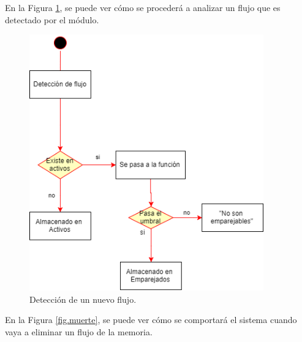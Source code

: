\intro En la Figura \ref{fig.nacimiento}, se puede ver cómo se procederá a analizar un flujo que es detectado por el módulo.

\begin{figure}[H]
  \includegraphics[width=0.9\textwidth]{imagenes/nacimiento.png}
  \centering
  \caption{Detección de un nuevo flujo.}\label{fig.nacimiento}
\end{figure}

\intro En la Figura \ref{fig.muerte}, se puede ver cómo se comportará el sistema cuando vaya a eliminar un flujo de la memoria.


